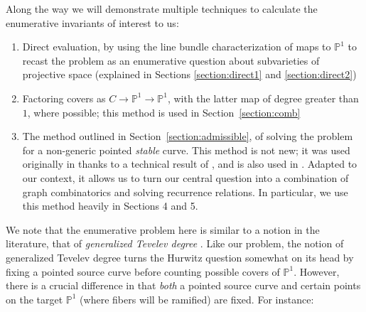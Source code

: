 \documentclass[11pt]{article}           %
\renewcommand{\P}{\mathbb P}
\theoremstyle{definition}
\begin{document}
Along the way we will demonstrate multiple techniques to calculate the enumerative
invariants of interest to us:
\begin{enumerate}
\item Direct evaluation, by using the line bundle characterization of maps to $\P^1$ to recast the problem as an enumerative question about subvarieties of projective space (explained in Sections \ref{section:direct1} and \ref{section:direct2})
\item Factoring covers as $C\to\P^1\to\P^1$, with the latter map of degree greater than $1$, where possible; this method is used in Section~\ref{section:comb}
  \item The method outlined in Section~\ref{section:admissible}, of solving the problem for a non-generic pointed {\it stable} curve. This method is not new; it was used originally in \cite{Cela} thanks to a technical result of \cite{Lian}, and is also used in \cite{Generalized}. Adapted to our context, it allows us to turn our central question into a combination of graph combinatorics and solving recurrence relations. In particular, we use this method heavily in Sections 4 and 5.
  \end{enumerate}

We note that the enumerative problem here is similar to a notion in the literature,
that of {\it generalized Tevelev degree} \cite{Generalized}. Like our problem, the notion
of generalized Tevelev degree turns the Hurwitz question somewhat on its head by fixing
a pointed source curve before counting possible covers of $\P^1$. However, there is a crucial difference
in that {\it both} a pointed source curve and certain points on the target $\P^1$ (where fibers will be ramified) are fixed. For instance:
\end{document}
